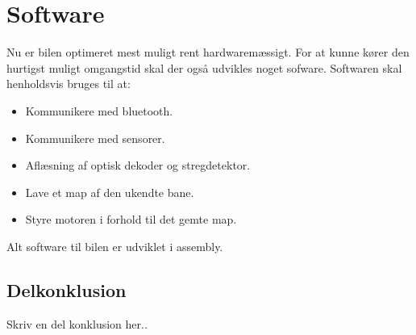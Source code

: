 
\section{Software}
Nu er bilen optimeret mest muligt rent hardwaremæssigt. For at kunne kører den hurtigst muligt omgangstid skal der også udvikles noget sofware. Softwaren skal henholdsvis bruges til at:
\begin{itemize}
\item Kommunikere med bluetooth.
\item Kommunikere med sensorer.
\item Aflæsning af optisk dekoder og stregdetektor.
\item Lave et map af den ukendte bane.
\item Styre motoren i forhold til det gemte map.
\end{itemize}
Alt software til bilen er udviklet i assembly.










\subsection{Delkonklusion}
Skriv en del konklusion her..